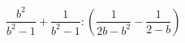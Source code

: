 \begin{ex}[type=expression]
	\begin{condition}
		\( \dfrac{b^2}{b^2-1}+\dfrac{1}{b^2-1}:\left( \dfrac{1}{2b-b^2}-\dfrac{1}{2-b} \right) \)
	\end{condition}
\end{ex}